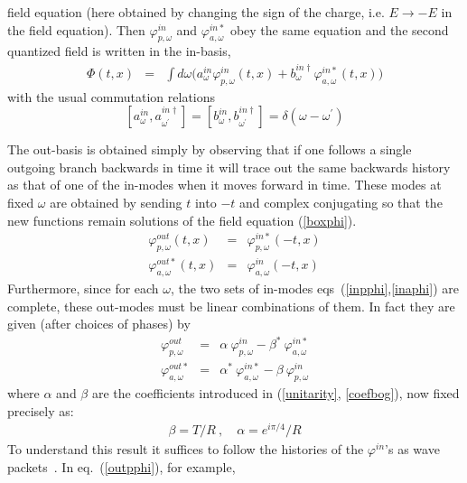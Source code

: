\documentclass[12pt,oneside]{report}
\begin{document}
field equation (here obtained by changing the sign of the charge, i.e.
$E\to -E$ in the field equation). Then $\varphi^{in}_{p,\omega}$ and
$\varphi^{in
*}_{a,\omega}$ obey the same equation and the second quantized field is
written 
in the in-basis,
\begin{eqnarray}
\Phi (t,x) & = & \int d\omega \bigl(a^{in}_\omega \varphi^{in}_{p,\omega}
(t,x) + b^{in\dagger }_\omega \varphi^{in*}_{a,\omega}(t,x)\bigr)
\label{qphi} 
\end{eqnarray}
with the usual commutation relations
\begin{equation}
 \left[ a^{in}_\omega,a^{in\dagger }_{\omega^\prime} \right] =
 \left[ b^{in}_\omega, b^{in\dagger }_{\omega^\prime} \right] =
\delta(\omega - \omega^\prime) \label{comrel}
\end{equation}
\par The out-basis is obtained simply by observing that if one
follows a single outgoing branch backwards in
time it will trace out the same backwards history
as that of one of the in-modes  when it moves forward in time. 
These modes at fixed $\omega$ are obtained by sending $t$ into
$-t$ and complex conjugating so that the new functions remain solutions of the 
 field equation (\ref{boxphi}).
\begin{eqnarray}
\varphi^{out}_{p,\omega}(t,x) & = & \varphi^{in *}_{p,\omega}(-t,x)\nonumber\\
\varphi^{out*}_{a,\omega} (t,x)& = &  \varphi^{in}_{a,\omega}(-t,x)
\label{outaphiB}\end{eqnarray}
\noindent Furthermore, since for each $\omega$,
the two sets of in-modes eqs~(\ref{inpphi},\ref{inaphi}) are complete,
these out-modes must be linear combinations of them.
In fact they are given (after  choices of phases) by
\begin{eqnarray}
\varphi^{out}_{p,\omega} & = & \alpha \ \varphi^{in}_{p,\omega}
- \beta ^{*} \ \varphi^{in*}_{a,\omega} \label{outpphi} \\
\varphi^{out*}_{a,\omega} & = & \alpha^{*} \ \varphi^{in*}_{a,\omega}
- \beta \ \varphi^{in}_{p,\omega} \label{outaphi}
\end{eqnarray}
where $\alpha$ and $\beta$
are the coefficients introduced in (\ref{unitarity}, \ref{coefbog}), now fixed precisely as: 
\begin{eqnarray}
\beta = T/R\ ,\quad \alpha = e^{i\pi/4} /R
\end{eqnarray}
 To understand this
result it suffices 
to follow the histories of the
$\varphi^{in}$'s as wave packets~\cite{BMPPS}.  In eq.~(\ref{outpphi}), for example,
\end{document}
